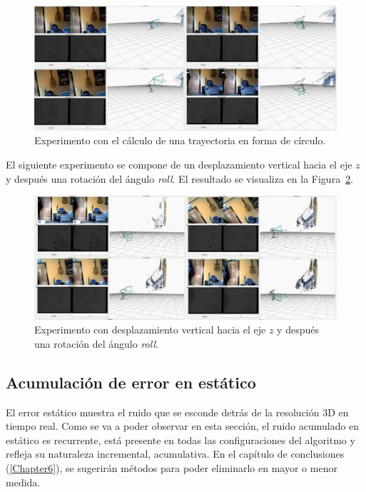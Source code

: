 \begin{figure}[th]
\centering
\includegraphics[scale=0.2]{Figures/tests/ex-1.png}
\decoRule
\caption[Experimento con el cálculo de una trayectoria en forma de círculo]{Experimento con el cálculo de una trayectoria en forma de círculo.}
\label{fig:ex1}
\end{figure}
 
El siguiente experimento se compone de un desplazamiento vertical hacia el eje $z$ y después una rotación del ángulo \textit{roll}. El resultado se visualiza en la Figura~\ref{fig:ex2}.
 
\begin{figure}[th]
\centering
\includegraphics[scale=0.2]{Figures/tests/ex-2.png}
\decoRule
\caption[Experimento con desplazamiento vertical hacia el eje $z$ y después una rotación del ángulo \textit{roll}]{Experimento con desplazamiento vertical hacia el eje $z$ y después una rotación del ángulo \textit{roll}.}
\label{fig:ex2}
\end{figure}


\subsection{Acumulación de error en estático}

El error estático muestra el ruido que se esconde detrás de la resolución 3D en tiempo real. Como se va a poder observar en esta sección, el ruido acumulado en estático es recurrente, está presente en todas las configuraciones del algoritmo y refleja su naturaleza incremental, acumulativa. En el capítulo de conclusiones (\ref{Chapter6}), se sugerirán métodos para poder eliminarlo en mayor o menor medida.

